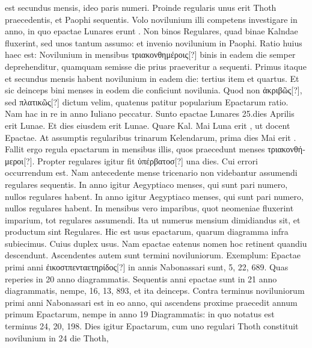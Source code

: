 est secundus mensis, ideo paris numeri.
Proinde regularis unus
erit Thoth praecedentis, et Paophi sequentis.
Volo novilunium illi
competens investigare in anno, in quo epactae Lunares erunt .
Non
binos Regulares, quad binae Kalndae fluxerint, sed unos tantum
assumo: et invenio novilunium in  Paophi.
Ratio huius haec
est: Novilunium in mensibus \textgreek{τριακονθημέροις}[?]
 binis in eadem die semper
deprehenditur, quamquam semisse die prius praeveritur a sequenti.
Primus itaque et secundus mensis habent novilunium in eadem
die: tertius item et quartus.
Et sic deinceps bini menses in
eodem die conficiunt novilunia.
Quod non \textgreek{ἀκριβῶς}[?], sed \textgreek{πλατικῶς}[?]
dictum velim, quatenus patitur popularium Epactarum ratio.
Nam
hac in re in anno Iuliano peccatur.
Sunto epactae Lunares 25.dies
Aprilis erit  Lunae.
Et dies eiusdem erit  Lunae.
Quare Kal. Mai Luna erit , ut docent Epactae.
At assumptis
regularibus trinarum Kelendarum, prima dies Mai erit .
Fallit
ergo regula epactarum in mensibus illis, quos praecedunt menses
\textgreek{τριακονθήμεροι}[?].
Propter regulares igitur fit \textgreek{ὑπέρβατοσ}[?] una dies.
Cui
errori occurrendum est.
Nam antecedente mense tricenario non videbantur
assumendi regulares sequentis.
In anno igitur Aegyptiaco
menses, qui sunt pari numero, nullos regulares habent.
In anno igitur Aegyptiaco
menses, qui sunt pari numero, nullos regulares habent.
In mensibus
vero imparibus, quot neomeniae fluxerint imparium, tot regulares
assumendi.
Ita ut numerus mensium dimidiandus sit, et productum
sint Regulares.
Hic est usus epactarum, quarum diagramma
infra subiecimus.
Cuius duplex usus.
Nam epactae eatenus nomen
hoc retinent quandiu descendunt.
Ascendentes autem sunt termini
noviluniorum.
Exemplum: Epactae primi anni \textgreek{ἐικοστπενταετηρίδος}[?] in annis
Nabonassari sunt, 5, 22, 689.
Quas reperies in 20 anno diagrammatis.
Sequentis anni epactae sunt in 21 anno diagrammatis, nempe,
16, 13, 893, et ita deinceps.
Contra terminus noviluniorum primi anni
Nabonassari est in eo anno, qui ascendens proxime praecedit annum
primum Epactarum, nempe in anno 19 Diagrammatis: in
quo notatus est terminus 24, 20, 198.
Dies igitur  Epactarum,
cum uno regulari Thoth constituit novilunium in 24 die Thoth,
